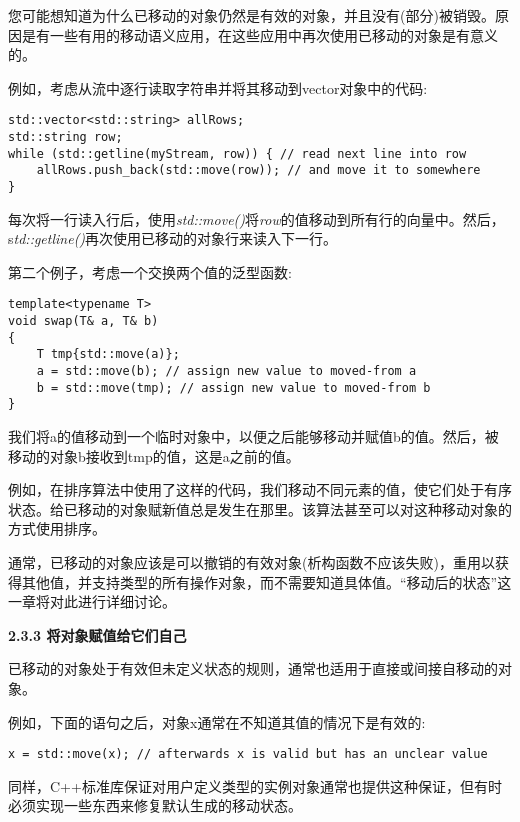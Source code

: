 您可能想知道为什么已移动的对象仍然是有效的对象，并且没有(部分)被销毁。原因是有一些有用的移动语义应用，在这些应用中再次使用已移动的对象是有意义的。\par

例如，考虑从流中逐行读取字符串并将其移动到vector对象中的代码:\par

\begin{lstlisting}[caption={}]
std::vector<std::string> allRows;
std::string row;
while (std::getline(myStream, row)) { // read next line into row
	allRows.push_back(std::move(row)); // and move it to somewhere
}
\end{lstlisting}

每次将一行读入行后，使用\textit{std::move()}将\textit{row}的值移动到所有行的向量中。然后，s\textit{td::getline()}再次使用已移动的对象行来读入下一行。\par

第二个例子，考虑一个交换两个值的泛型函数:\par

\begin{lstlisting}[caption={}]
template<typename T>
void swap(T& a, T& b)
{
	T tmp{std::move(a)};
	a = std::move(b); // assign new value to moved-from a
	b = std::move(tmp); // assign new value to moved-from b
}
\end{lstlisting}

我们将a的值移动到一个临时对象中，以便之后能够移动并赋值b的值。然后，被移动的对象b接收到tmp的值，这是a之前的值。\par

例如，在排序算法中使用了这样的代码，我们移动不同元素的值，使它们处于有序状态。给已移动的对象赋新值总是发生在那里。该算法甚至可以对这种移动对象的方式使用排序。\par

通常，已移动的对象应该是可以撤销的有效对象(析构函数不应该失败)，重用以获得其他值，并支持类型的所有操作对象，而不需要知道具体值。“移动后的状态”这一章将对此进行详细讨论。\par

\hspace*{\fill} \par %
\textbf{2.3.3 将对象赋值给它们自己}

已移动的对象处于有效但未定义状态的规则，通常也适用于直接或间接自移动的对象。\par

例如，下面的语句之后，对象x通常在不知道其值的情况下是有效的:\par

\begin{lstlisting}[caption={}]
x = std::move(x); // afterwards x is valid but has an unclear value
\end{lstlisting}

同样，C++标准库保证对用户定义类型的实例对象通常也提供这种保证，但有时必须实现一些东西来修复默认生成的移动状态。\par


